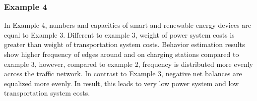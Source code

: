 \subsubsection{Example 4}

In Example 4, numbers and capacities of smart and renewable energy devices are equal to Example 3. Different to example 3, weight of power system costs is greater than weight of transportation system costs. Behavior estimation results show higher frequency of edges around and on charging stations compared to example 3, however, compared to example 2, frequency is distributed more evenly across the traffic network. In contrast to Example 3, negative net balances are equalized more evenly. In result, this leads to very low power system and low transportation system costs.